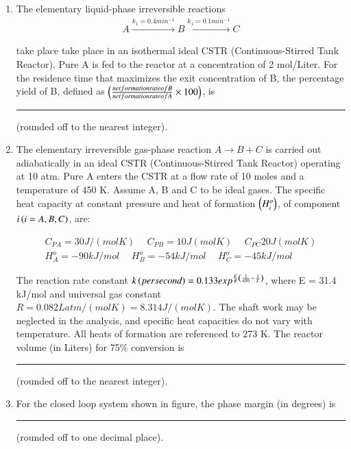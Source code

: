 \documentclass[journal]{IEEEtran}
\begin{document}
\begin{enumerate}
\begin{figure}[h!]
\end{figure}
    \item The elementary liquid-phase irreversible reactions 
\begin{align*}
     A \xrightarrow{{k_1 = 0.4 min^{-1}}} B \xrightarrow{{k_1 = 0.1 min^{-1}}} C
\end{align*}

    take place take place in an isothermal ideal CSTR (Continuous-Stirred Tank Reactor). Pure A is fed to the reactor at a concentration of 2 mol/Liter. For the residence time that maximizes the exit concentration of B, the percentage yield of B, defined as $\left(\frac{net formation rate of B}{net formation rate of A} \times 100\right)$, is \rule{1.5cm}{0.1mm}(rounded off to the nearest integer).

    \item The elementary irreversible gas-phase reaction $A \to B + C$ is carried out adiabatically in an ideal CSTR (Continuous-Stirred Tank Reactor) operating at 10 atm. Pure A enters the CSTR at a flow rate of 10 moles and a temperature of 450 K. Assume A, B and C to be ideal gases. The specific heat capacity at constant pressure   and heat of formation $\left(H^{o}_{i}\right)$, of component $i \left(i = A, B, C\right)$, are: 

    \begin{align*}
        C_{PA} = 30J/(mol K) \hspace{15pt} C_{PB} = 10J(mol K) \hspace{15pt} C_{PC} 20J(mol K) \\ 
        H^{o}_{A} = -90 kJ/mol \hspace{15pt} H^{o}_{B} = -54 kJ/mol \hspace{15pt} H^{o}_{C} = -45 kJ/mol 
    \end{align*}

    The reaction rate constant $k \left(per second\right) = 0.133 exp^{\frac{E}{R}\left(\frac{1}{450} - \frac{1}{T}\right)}$, where E = 31.4 kJ/mol and universal gas constant $R = 0.082 L atm/(mol K) = 8.314 J/(mol K)$. The shaft work may be neglected in the analysis, and specific heat capacities do not vary with temperature. All heats of formation are referenced to 273 K. The reactor volume (in Liters) for 75\% conversion is \rule{1.5cm}{0.1mm}(rounded off to the nearest integer). 

    \item For the closed loop system shown in figure, the phase margin (in degrees) is \rule{2cm}{0.1mm}(rounded off to one decimal place). 


\end{enumerate}
\end{document}
